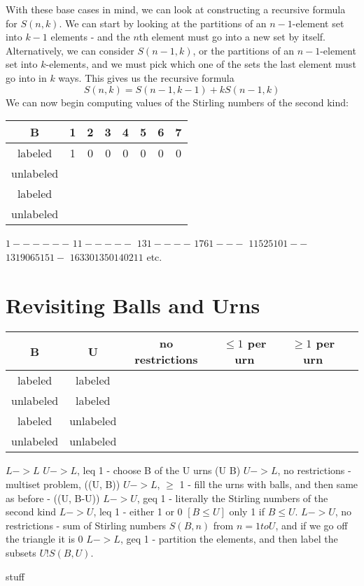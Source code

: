 \documentclass[11pt,twosided]{article}
\begin{document}
With these base cases in mind, we can look at constructing a recursive formula for $S(n, k)$. We can start by looking at the partitions of an $n-1$-element set into $k-1$ elements - and the $n$th element must go into a new set by itself. Alternatively, we can consider $S(n-1, k)$, or the partitions of an $n-1$-element set into $k$-elements, and we must pick which one of the sets the last element must go into in $k$ ways. This gives us the recursive formula
\[
	S(n, k) = S(n-1, k-1) + kS(n-1, k)
\]
We can now begin computing values of the Stirling numbers of the second kind: 
\begin{center}
\begin{tabular}{c | c c c c c c c}
B & 1 & 2 & 3 & 4 & 5 & 6 & 7 \\ \hline 
labeled & 1 & 0 & 0 & 0 & 0 & 0 & 0 \\
unlabeled & & & \\
labeled & & & \\
unlabeled & & & \\

\end{tabular}
\end{center}
$1 - - - - - -$
$1 1 - - - - -$
$1 3 1 - - - -$
$1 7 6 1 - - -$
$1 15 25 10 1 - -$
$1 31 90 65 15 1 -$
$1 63 301 350 140 21 1$ etc. 

\section{Revisiting Balls and Urns}
\begin{center}
\begin{tabular}{c c c c c c}
B & U & no restrictions & $\leq 1$ per urn & $\geq 1$ per urn \\ \hline 
labeled & labeled & & & \\
unlabeled & labeled & & & \\
labeled & unlabeled & & & \\
unlabeled & unlabeled & & & \\

\end{tabular}
$L -> L$ 
$U -> L$, leq 1 - choose B of the U urns (U B)
$U -> L$, no restrictions - multiset problem, ((U, B))
$U -> L$, $\geq$ 1 - fill the urns with balls, and then same as before - ((U, B-U))
$L -> U$, geq 1 - literally the Stirling numbers of the second kind
$L -> U$, leq 1 - either 1 or 0 $[ B \leq U]$ only 1 if $B \leq U$. 
$L -> U$, no restrictions - sum of Stirling numbers $S(B, n)$ from $n = 1 to U$, and if we go off the triangle it is 0
$L -> L$, geq 1 - partition the elements, and then label the subsets $U! S(B, U)$. 
\end{center}
stuff 
\end{document}
